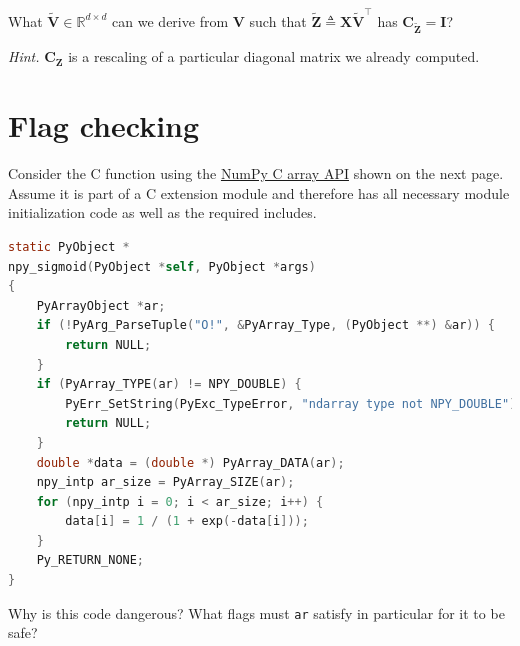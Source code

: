 \documentclass{article}
\numberwithin{equation}{section}
\begin{document}
\medskip

What $ \tilde{\mathbf{V}} \in \mathbb{R}^{d \times d} $ can we derive from
$ \mathbf{V} $ such that $ \tilde{\mathbf{Z}} \triangleq
\mathbf{X}\tilde{\mathbf{V}}^\top $ has
$ \mathbf{C}_{\tilde{\mathbf{Z}}} = \mathbf{I} $?

\medskip

\textit{Hint.} $ \mathbf{C}_\mathbf{Z} $ is a rescaling of a particular
diagonal matrix we already computed.

\section{Flag checking}

Consider the C function using the \href{
    https://numpy.org/devdocs/reference/c-api/array.html
}{NumPy C array API} shown on the next page. Assume it is part of a C
extension module and therefore has all necessary module initialization code
as well as the required includes.

\begin{lstlisting}[language = C]
static PyObject *
npy_sigmoid(PyObject *self, PyObject *args)
{
    PyArrayObject *ar;
    if (!PyArg_ParseTuple("O!", &PyArray_Type, (PyObject **) &ar)) {
        return NULL;
    }
    if (PyArray_TYPE(ar) != NPY_DOUBLE) {
        PyErr_SetString(PyExc_TypeError, "ndarray type not NPY_DOUBLE");
        return NULL;
    }
    double *data = (double *) PyArray_DATA(ar);
    npy_intp ar_size = PyArray_SIZE(ar);
    for (npy_intp i = 0; i < ar_size; i++) {
        data[i] = 1 / (1 + exp(-data[i]));
    }
    Py_RETURN_NONE;
}
\end{lstlisting}

Why is this code dangerous? What flags must \texttt{ar} satisfy in particular
for it to be safe?
\end{document}
